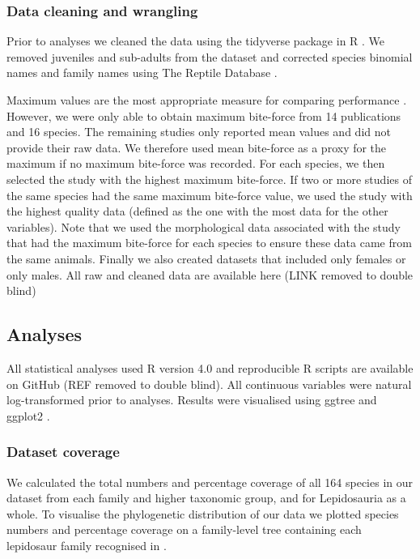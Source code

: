 \documentclass[a4paper, 12pt]{article}
\begin{document}
\subsubsection{Data cleaning and wrangling}
Prior to analyses we cleaned the data using the tidyverse package \citep{wickham2019welcome} in R \citep{R-Core-Team:2020}. 
We removed juveniles and sub-adults from the dataset and corrected species binomial names and family names using The Reptile Database \citep{uetz2020reptile}. 

Maximum values are the most appropriate measure for comparing performance \citep{hertz1988time,losos2002cautionary}. 
However, we were only able to obtain maximum bite-force from 14 publications and 16 species. 
The remaining studies only reported mean values and did not provide their raw data. 
We therefore used mean bite-force as a proxy for the maximum if no maximum bite-force was recorded. 
For each species, we then selected the study with the highest maximum bite-force. 
If two or more studies of the same species had the same maximum bite-force value, we used the study with the highest quality data (defined as the one with the most data for the other variables). 
Note that we used the morphological data associated with the study that had the maximum bite-force for each species to ensure these data came from the same animals. 
Finally we also created datasets that included only females or only males. 
All raw and cleaned data are available here (LINK removed to double blind)

\subsection{Analyses}
All statistical analyses used R version 4.0 \citep{R-Core-Team:2020} and reproducible R scripts are available on GitHub (REF removed to double blind).
All continuous variables were natural log-transformed prior to analyses. 
Results were visualised using ggtree \citep{yu2017ggtree} and ggplot2 \citep{wickham2011ggplot2}.

\subsubsection{Dataset coverage}
We calculated the total numbers and percentage coverage of all 164 species in our dataset from each family and higher taxonomic group, and for Lepidosauria as a whole. 
To visualise the phylogenetic distribution of our data we plotted species numbers and percentage coverage on a family-level tree containing each lepidosaur family recognised in \citet{uetz2020reptile}. 
\end{document}
